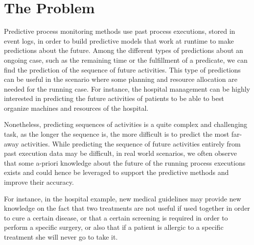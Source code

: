 
\section{The Problem} %
\label{sec:the_problem}
Predictive process monitoring methods use past process executions, stored in event logs, in order to build predictive models that work at runtime to make predictions about the future.
Among the different types of predictions about an ongoing case, such as the remaining time or the fulfillment of a predicate, we can find the prediction of the sequence of future activities. This type of predictions can be useful in the scenario where some planning and resource allocation are needed for the running case.
For instance, the hospital management can be highly interested in predicting the future activities of patients to be able to best organize machines and resources of the hospital.



Nonetheless, predicting sequences of activities is a quite complex and challenging task, as the longer the sequence is, the more difficult is to predict the most far-away activities.
While predicting the sequence of future activities entirely from past execution data may be difficult, in real world scenarios, we often observe that some a-priori knowledge about the future of the running process executions exists and could hence be leveraged to support the predictive methods and improve their accuracy.


For instance, in the hospital example, new medical guidelines may provide new knowledge on the fact that two treatments are not useful if used together in order to cure a certain disease, or that a certain screening is required in order to perform a specific surgery, or also that if a patient is allergic to a specific treatment she will never go to take it.


